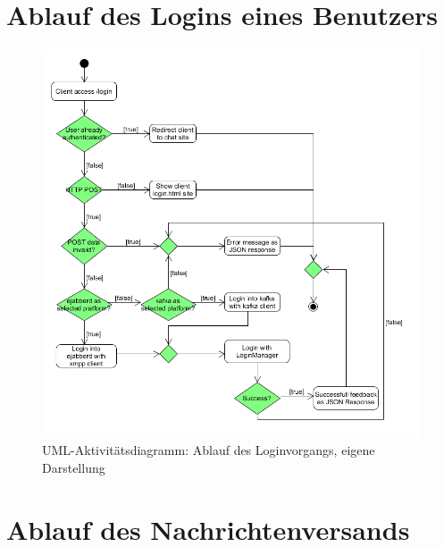 \documentclass[a4paper,titlepage,halfparskip,12pt]{scrreprt}
\begin{document}
\pagebreak

\section{Ablauf des Logins eines Benutzers}

\begin{figure}[h]
	\centering
	\includegraphics[width=\textwidth]{images/umlLogin}
	\caption{\acs{UML}-Aktivitätsdiagramm: Ablauf des Loginvorgangs, eigene Darstellung}
	\label{img:umlActivityLogin}
\end{figure}

\pagebreak

\section{Ablauf des Nachrichtenversands}
\end{document}
